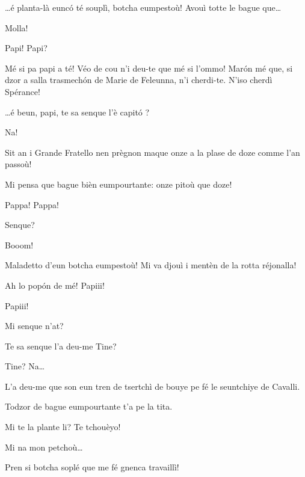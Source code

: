 \begin{drama}
\Tanteunspeaks \ldots é planta-là eunc\'o té souplì, botcha eumpestoù! Avouì totte le bague que\ldots


\Tanteunspeaks{} Molla!

\Alicespeaks Papi! Papi?

\Tanteunspeaks{} Mé si pa papi a té! Véo de cou n'i deu-te que mé si l’ommo! Mar\'on mé que, si dzor a salla trasmech\'on de Marie de Feleunna, n’i cherdi-te. N’iso cherdì Spérance!

\Alicespeaks{} \ldots é beun, papi, te sa senque l'è capit\'o ? 

\Tanteunspeaks Na!

\Alicespeaks Sit an i Grande Fratello nen prègnon maque onze a la plase de doze comme l’an passoù!

\Tanteunspeaks{} Mi pensa que bague bièn eumpourtante: onze pitoù que doze!

\Twitterspeaks Pappa! Pappa!

\Tanteunspeaks Senque?


\Twitterspeaks Booom!

\Tanteunspeaks{} Maladetto d'eun botcha eumpestoù! Mi va djouì i mentèn de la rotta réjonalla!

\Alicespeaks{} Ah lo pop\'on de mé! Papiii!


\Alicespeaks Papiii!

\Tanteunspeaks Mi senque n'at?

\Alicespeaks Te sa senque l'a deu-me Tine?

\Tanteunspeaks Tine? Na\ldots

\Alicespeaks L'a deu-me que son eun tren de tsertchì de bouye pe fé le seuntchiye de Cavalli. 

\Tanteunspeaks{} Todzor de bague eumpourtante t'a pe la tita.


\Tanteunspeaks Mi te la plante li? Te tchouèyo!

\Alicespeaks Mi na mon petchoù\ldots

\Tanteunspeaks{} Pren si botcha soplé que me fé gnenca travaillì!


\end{drama}
